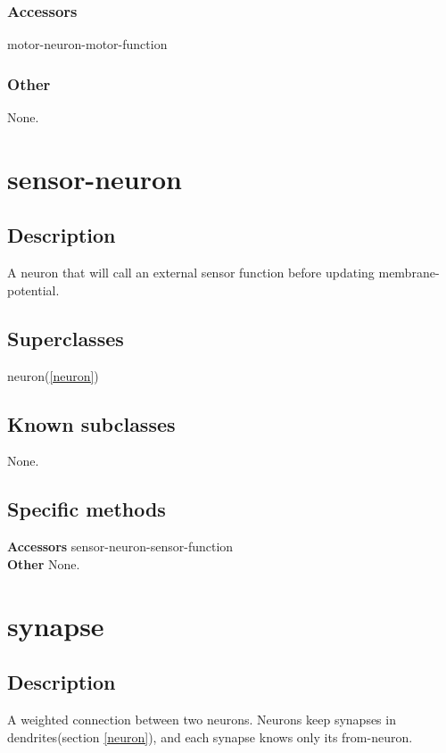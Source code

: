 \documentclass[english]{article}
\begin{document}
\subsubsection{Accessors}
motor-neuron-motor-function\\

\subsubsection{Other}
None.\\


\newpage
\section{sensor-neuron}
\label{sensor-neuron}

\subsection{Description}
A neuron that will call an external sensor function before updating membrane-potential.

\subsection{Superclasses}
neuron(\ref{neuron})

\subsection{Known subclasses}
None.

\subsection{Specific methods}
\textbf{Accessors}
sensor-neuron-sensor-function\\

\textbf{Other}
None.\\

\section{synapse}
\label{synapse}

\subsection{Description}
A weighted connection between two neurons. Neurons keep synapses in dendrites(section \ref{neuron}), and each synapse knows only its from-neuron.
\end{document}
